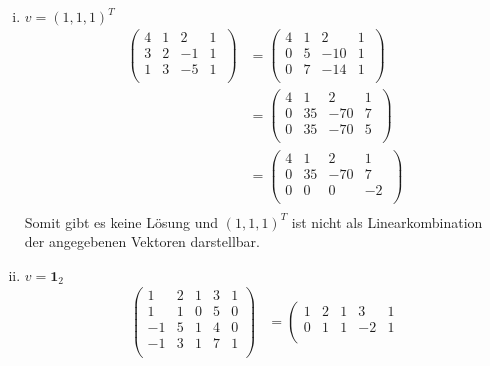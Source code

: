 \documentclass{article}
\begin{document}
\begin{enumerate}[(i)]
\item $v = (1,1,1)^T$
  \begin{align*}
    \left(
    \begin{array}{ccc|c}
      4 & 1 & 2  & 1 \\
      3 & 2 & -1 & 1 \\
      1 & 3 & -5 & 1 \\
    \end{array}\
    \right)
    &=
    \left(
    \begin{array}{ccc|c}
      4 & 1 & 2   & 1 \\
      0 & 5 & -10 & 1 \\
      0 & 7 & -14 & 1 \\
    \end{array}\
    \right) \\
    &=
    \left(
    \begin{array}{ccc|c}
      4 & 1 & 2   & 1 \\
      0 & 35 & -70 & 7 \\
      0 & 35 & -70 & 5 \\
    \end{array}\
    \right) \\
    &=
    \left(
    \begin{array}{ccc|c}
      4 & 1  & 2   & 1 \\
      0 & 35 & -70 & 7 \\
      0 & 0  & 0   & -2 \\
    \end{array}\
    \right) \\
  \end{align*}
  Somit gibt es keine Lösung und $(1,1,1)^T$ ist nicht als Linearkombination der angegebenen Vektoren darstellbar.
\item $v = \bm{1}_2$
  \begin{align*}
    \left(
    \begin{array}{cccc|c}
      1  & 2 & 1 & 3 & 1 \\
      1  & 1 & 0 & 5 & 0 \\
      -1 & 5 & 1 & 4 & 0 \\
      -1 & 3 & 1 & 7 & 1 \\
    \end{array}
    \right)
    &=
    \left(
    \begin{array}{cccc|c}
      1 & 2 & 1           & 3            & 1            \\
      0 & 1 & 1           & -2           & 1            \\

\end{array}
\end{align*}
\end{enumerate}
\end{document}
